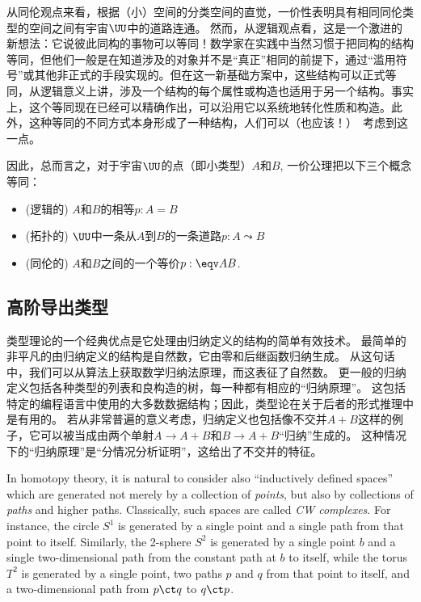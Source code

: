 从同伦观点来看，根据（小）空间的分类空间的直觉，一价性表明具有相同同伦类型的空间之间有宇宙$\UU$中的道路连通。
然而，从逻辑观点看，这是一个激进的新想法：它说彼此同构的事物可以等同！数学家在实践中当然习惯于把同构的结构等同，但他们一般是在知道涉及的对象并不是“真正”相同的前提下，通过“滥用符号”或其他非正式的手段实现的。但在这一新基础方案中，这些结构可以正式等同，从逻辑意义上讲，涉及一个结构的每个属性或构造也适用于另一个结构。事实上，这个等同现在已经可以精确作出，可以沿用它以系统地转化性质和构造。此外，这种等同的不同方式本身形成了一种结构，人们可以（也应该！）\ 考虑到这一点。

因此，总而言之，对于宇宙$\UU$的点（即小类型）$A$和$B$, 一价公理把以下三个概念等同：
\begin{itemize}
\item (逻辑的) $A$和$B$的相等$p:A=B$
\item (拓扑的) $\UU$中一条从$A$到$B$的一条道路$p:A \leadsto B$
\item (同伦的) $A$和$B$之间的一个等价$p:\eqv A B$.
\end{itemize}

\subsection*{高阶导出类型}%

类型理论的一个经典优点是它处理由归纳定义的结构的简单有效技术。
最简单的非平凡的由归纳定义的结构是自然数，它由零和后继函数归纳生成。
从这句话中，我们可以从算法上获取数学归纳法原理，而这表征了自然数。
更一般的归纳定义包括各种类型的列表和良构造的树，每一种都有相应的“归纳原理”。
这包括特定的编程语言中使用的大多数数据结构；因此，类型论在关于后者的形式推理中是有用的。
若从非常普遍的意义考虑，归纳定义也包括像不交并$A+B$这样的例子，它可以被当成由两个单射$A\to A+B$和$B\to A+B$“归纳”生成的。
这种情况下的“归纳原理”是“分情况分析证明”，这给出了不交并的特征。

In homotopy theory, it is natural to consider also ``inductively defined spaces'' which are generated not merely by a collection of \emph{points}, but also by collections of \emph{paths} and higher paths.
Classically, such spaces are called \emph{CW complexes}.
%
For instance, the circle $S^1$ is generated by a single point and a single path from that point to itself.
Similarly, the 2-sphere $S^2$ is generated by a single point $b$ and a single two-dimensional path from the constant path at $b$ to itself, while the torus $T^2$ is generated by a single point, two paths $p$ and $q$ from that point to itself, and a two-dimensional path from $p\ct q$ to $q\ct p$.

